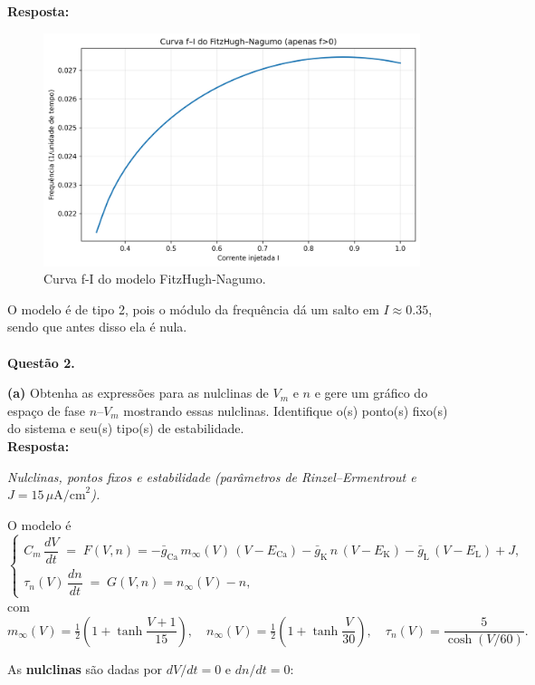 \documentclass[english,11pt,a4paper]{article}
\begin{document}
	\noindent\textbf{Resposta:}
	
	\begin{figure}[H]
		\centering
		\includegraphics[width=11cm]{../figures/ex_1k.png}
		\caption{Curva f-I do modelo FitzHugh-Nagumo.}
	\end{figure}
	
	\noindent O modelo é de tipo 2, pois o módulo da frequência dá um salto em $I \approx 0.35$, sendo que antes disso ela é nula.\\\\
	
	\noindent\textbf{Questão 2.}
	
	\noindent\textbf{(a)} Obtenha as expressões para as nulclinas de $V_m$ e $n$ e gere um gráfico do espaço de fase $n$–$V_m$ mostrando essas nulclinas. Identifique o(s) ponto(s) fixo(s) do sistema e seu(s) tipo(s) de estabilidade.\\
	
	\noindent\textbf{Resposta:}
	
	\noindent\textit{Nulclinas, pontos fixos e estabilidade (parâmetros de Rinzel–Ermentrout e $J=15\,\mu\mathrm{A/cm}^2$).}
	
	\medskip
	O modelo é
	\[
	\begin{cases}
		C_m\,\dfrac{dV}{dt} \;=\; F(V,n) 
		= -\bar g_{\mathrm{Ca}}\,m_\infty(V)\,(V-E_{\mathrm{Ca}})
		- \bar g_{\mathrm K}\,n\,(V-E_{\mathrm K})
		- \bar g_{\mathrm L}\,(V-E_{\mathrm L})
		+ J,\\[6pt]
		\tau_n(V)\,\dfrac{dn}{dt} \;=\; G(V,n)
		= n_\infty(V)-n,
	\end{cases}
	\]
	com
	\[
	m_\infty(V)=\tfrac12\!\left(1+\tanh\dfrac{V+1}{15}\right),\quad
	n_\infty(V)=\tfrac12\!\left(1+\tanh\dfrac{V}{30}\right),\quad
	\tau_n(V)=\dfrac{5}{\cosh(V/60)}.
	\]
	
	\noindent As \textbf{nulclinas} são dadas por $dV/dt=0$ e $dn/dt=0$:
	
\end{document}
